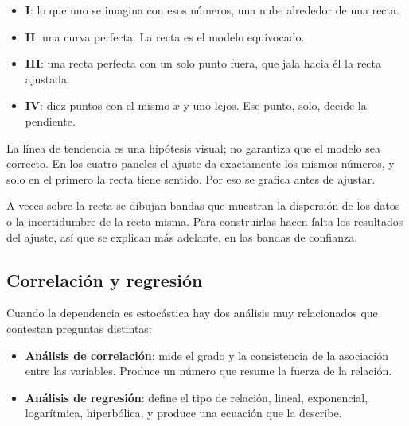 \documentclass[11pt,letterpaper]{article}
\begin{document}
\begin{itemize}[itemsep=0.3em]
    \item \textbf{I}: lo que uno se imagina con esos números, una nube
          alrededor de una recta.
    \item \textbf{II}: una curva perfecta. La recta es el modelo
          equivocado.
    \item \textbf{III}: una recta perfecta con un solo punto fuera, que
          jala hacia él la recta ajustada.
    \item \textbf{IV}: diez puntos con el mismo $x$ y uno lejos. Ese
          punto, solo, decide la pendiente.
\end{itemize}

\begin{ojo}
    La línea de tendencia es una hipótesis visual; no garantiza que el
    modelo sea correcto. En los cuatro paneles el ajuste da
    exactamente los mismos números, y solo en el primero la recta tiene
    sentido. Por eso se grafica antes de ajustar.
\end{ojo}

A veces sobre la recta se dibujan bandas que muestran la dispersión de
los datos o la incertidumbre de la recta misma. Para construirlas hacen
falta los resultados del ajuste, así que se explican más adelante, en
las bandas de confianza.


\subsection*{Correlación y regresión}

Cuando la dependencia es estocástica hay dos análisis muy relacionados
que contestan preguntas distintas:

\begin{itemize}[itemsep=0.3em]
    \item \textbf{Análisis de correlación}: mide el grado y la
          consistencia de la asociación entre las variables. Produce un
          número que resume la fuerza de la relación.
    \item \textbf{Análisis de regresión}: define el tipo de relación,
          lineal, exponencial, logarítmica, hiperbólica, y produce una
          ecuación que la describe.
\end{itemize}
\end{document}
